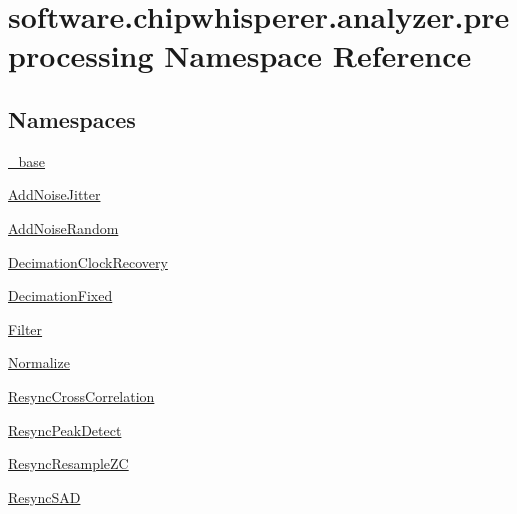 \hypertarget{namespacesoftware_1_1chipwhisperer_1_1analyzer_1_1preprocessing}{}\section{software.\+chipwhisperer.\+analyzer.\+preprocessing Namespace Reference}
\label{namespacesoftware_1_1chipwhisperer_1_1analyzer_1_1preprocessing}
\subsection*{Namespaces}
\begin{DoxyCompactItemize}
\item 
 \hyperlink{namespacesoftware_1_1chipwhisperer_1_1analyzer_1_1preprocessing_1_1__base}{\+\_\+base}
\item 
 \hyperlink{namespacesoftware_1_1chipwhisperer_1_1analyzer_1_1preprocessing_1_1AddNoiseJitter}{Add\+Noise\+Jitter}
\item 
 \hyperlink{namespacesoftware_1_1chipwhisperer_1_1analyzer_1_1preprocessing_1_1AddNoiseRandom}{Add\+Noise\+Random}
\item 
 \hyperlink{namespacesoftware_1_1chipwhisperer_1_1analyzer_1_1preprocessing_1_1DecimationClockRecovery}{Decimation\+Clock\+Recovery}
\item 
 \hyperlink{namespacesoftware_1_1chipwhisperer_1_1analyzer_1_1preprocessing_1_1DecimationFixed}{Decimation\+Fixed}
\item 
 \hyperlink{namespacesoftware_1_1chipwhisperer_1_1analyzer_1_1preprocessing_1_1Filter}{Filter}
\item 
 \hyperlink{namespacesoftware_1_1chipwhisperer_1_1analyzer_1_1preprocessing_1_1Normalize}{Normalize}
\item 
 \hyperlink{namespacesoftware_1_1chipwhisperer_1_1analyzer_1_1preprocessing_1_1ResyncCrossCorrelation}{Resync\+Cross\+Correlation}
\item 
 \hyperlink{namespacesoftware_1_1chipwhisperer_1_1analyzer_1_1preprocessing_1_1ResyncPeakDetect}{Resync\+Peak\+Detect}
\item 
 \hyperlink{namespacesoftware_1_1chipwhisperer_1_1analyzer_1_1preprocessing_1_1ResyncResampleZC}{Resync\+Resample\+Z\+C}
\item 
 \hyperlink{namespacesoftware_1_1chipwhisperer_1_1analyzer_1_1preprocessing_1_1ResyncSAD}{Resync\+S\+A\+D}
\end{DoxyCompactItemize}
